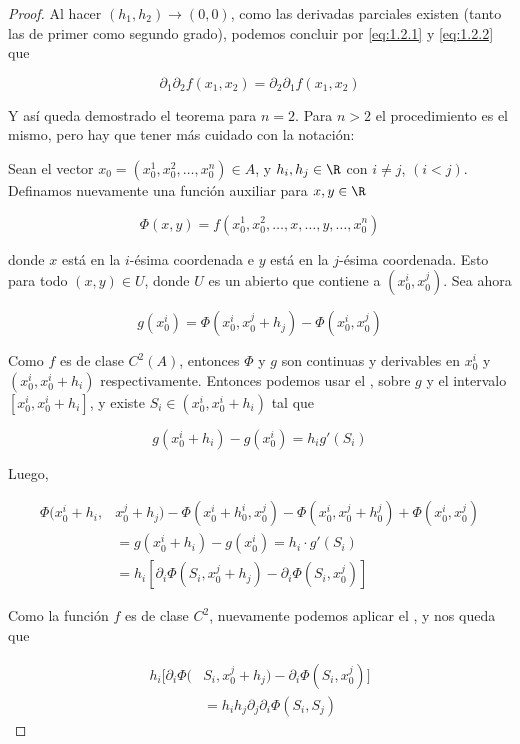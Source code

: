 \begin{proof}
    Al hacer $(h_1, h_2) \to (0, 0)$, como las derivadas parciales existen (tanto las de primer como segundo grado), podemos concluir por \ref{eq:1.2.1} y \ref{eq:1.2.2} que
    
    \[
    \partial_1\partial_2 f(x_1, x_2) = \partial_2\partial_1 f(x_1, x_2)
    \]
    
    Y así queda demostrado el teorema para $n=2$. Para $n>2$ el procedimiento es el mismo, pero hay que tener más cuidado con la notación:
    
    Sean el vector $x_0 = (x_0^1, x_0^2, \dots, x_0^n) \in A$, y $h_i, h_j \in \R$ con $i \neq j$, $(i < j)$. Definamos nuevamente una función auxiliar para $x, y \in \R$
    
    \[
    \Phi(x,y) = f(x_0^1, x_0^2, \dots, x, \dots, y, \dots, x_0^n)
    \]
    
    \noindent donde $x$ está en la $i$-ésima coordenada e $y$ está en la $j$-ésima coordenada. Esto para todo $(x, y) \in U$, donde $U$ es un abierto que contiene a $(x_0^i, x_0^j)$. Sea ahora
    
    \[
    g(x_0^i) = \Phi(x_0^i, x_0^j + h_j) - \Phi(x_0^i, x_0^j)
    \]
    
    Como $f$ es de clase $C^2(A)$, entonces $\Phi$ y $g$ son continuas y derivables en $x_0^i$ y $(x_0^i, x_0^i + h_i)$ respectivamente. Entonces podemos usar el \TVM, sobre $g$ y el intervalo $[x_0^i, x_0^i + h_i]$, y existe $S_i \in (x_0^i, x_0^i + h_i)$ tal que
    
    \[
    g(x_0^i + h_i) - g(x_0^i) = h_ig'(S_i)
    \]
    
    Luego,
    
    \begin{align*}
        \Phi(x_0^i + h_i, &x_0^j + h_j) - \Phi(x_0^i + h_0^i, x_0^j) - \Phi(x_0^i, x_0^j + h_0^j) + \Phi(x_0^i, x_0^j) \\
            &= g(x_0^i + h_i) - g(x_0^i) = h_i \cdot g'(S_i) \\
            &= h_i \left[ \partial_i \Phi(S_i, x_0^j + h_j) - \partial_i \Phi(S_i, x_0^j) \right]
    \end{align*}
    
    Como la función $f$ es de clase $C^2$, nuevamente podemos aplicar el \TVM, y nos queda que
    
    \begin{align}\label{eq:1.2.3}
        h_i \big[ \partial_i \Phi(&S_i, x_0^j + h_j) - \partial_i \Phi(S_i, x_0^j) \big] \nonumber \\
            &= h_ih_j \partial_j\partial_i \Phi(S_i, S_j)
    \end{align}
    

\end{proof}
